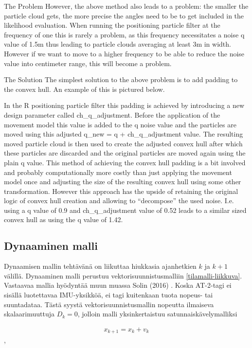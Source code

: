 \documentclass[
  12pt,
  a4paper, twoside]{book}
\begin{document}
The Problem
However, the above method also leads to a problem: the smaller the particle cloud gets, the more precise the angles need to be to get included in the likelihood evaluation. When running the positioning particle filter at the frequency of one this is rarely a problem, as this frequency necessitates a noise q value of 1.5m thus leading to particle clouds averaging at least 3m in width. However if we want to move to a higher frequency to be able to reduce the noise value into centimeter range, this will become a problem.

The Solution
The simplest solution to the above problem is to add padding to the convex hull. An example of this is pictured below.

In the R positioning particle filter this padding is achieved by introducing a new design parameter called ch\_q\_adjustment. Before the application of the movement model this value is added to the q noise value and the particles are moved using this adjusted q\_new = q + ch\_q\_adjustment value. The resulting moved particle cloud is then used to create the adjusted convex hull after which these particles are discarded and the original particles are moved again using the plain q value.
This method of achieving the convex hull padding is a bit involved and probably computationally more costly than just applying the movement model once and adjusting the size of the resulting convex hull using some other transformation. However this approach has the upside of retaining the original logic of convex hull creation and allowing to ``decompose'' the used noise. I.e. using a q value of 0.9 and ch\_q\_adjustment value of 0.52 leads to a similar sized convex hull as using the q value of 1.42.

\hypertarget{dynaaminen-malli}{%
\subsection{Dynaaminen malli}\label{dynaaminen-malli}}

Dynaamisen mallin tehtävänä on liikuttaa hiukkasia ajanhetkien \(k\) ja \(k+1\) välillä. Dynaaminen malli perustuu vektorisuunnistusmalliin \ref{tilamalli-liikkuva}. Vastaavaa mallia hyödyntää muun muassa Solin (2016) \citep{Solin-2016}. Koska AT-2-tagi ei sisällä luotettavaa IMU-yksikköä, ei tagi kuitenkaan tuota nopeus- tai suuntadataa. Tästä syystä vektorisuunnistusmallin nopeutta ilmaiseva skalaarimuuttuja \(D_k=0\), jolloin malli yksinkertaistuu satunnaiskävelymalliksi

\begin{align}\label{dynaaminen-malli-empiirinen}
x_{k+1}=x_k + v_k
\end{align},
\end{document}
